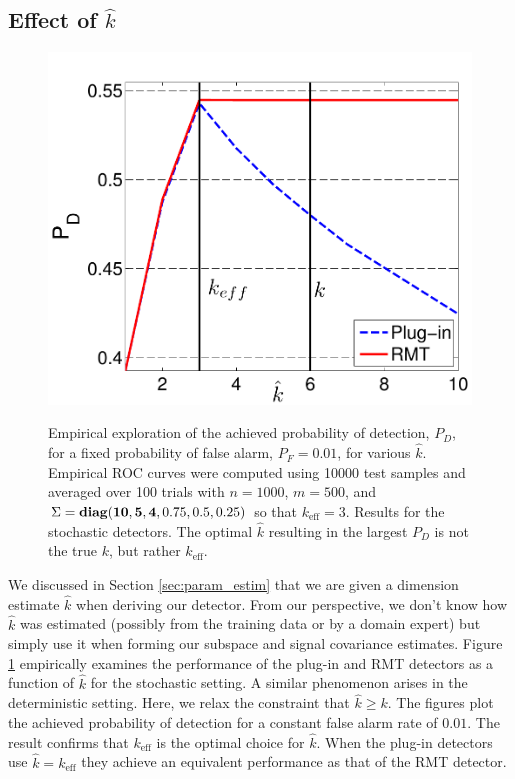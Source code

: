 \subsection{Effect of $\widehat{k}$}
\begin{figure}
\centering
\includegraphics[width=\figwidth]{figures/asend7.pdf}
\label{fig:stoch_khat}
\vspace{-0.1in}
\caption{Empirical exploration of the achieved probability of detection, $P_D$, for a
  fixed probability of false alarm, $P_F=0.01$, for various $\widehat{k}$. Empirical ROC
  curves were computed using 10000 test samples and averaged over 100 trials with
  $n=1000$, $m=500$, and $\Sigma = \mathop{\bf diag}({\bf{10,5,4}},0.75,0.5,0.25)$ so that
  $k_{\text{eff}}=3$. Results for the stochastic detectors. The optimal $\widehat{k}$ resulting in the largest $P_D$ is not the true $k$, but rather $k_\text{eff}$.} %
\label{fig:khat_graphs}
\vspace{-0.3in}
\end{figure}

We discussed in Section \ref{sec:param_estim} that we are given a dimension estimate
$\widehat{k}$ when deriving our detector. From our perspective, we don't know how
$\widehat{k}$ was estimated (possibly from the training data or by a domain expert) but
simply use it when forming our subspace and signal covariance estimates. Figure
\ref{fig:khat_graphs} empirically examines the performance of the plug-in and RMT detectors
as a function of $\widehat{k}$ for the stochastic setting. A similar phenomenon arises in
the deterministic setting. Here, we relax the constraint that $\widehat{k}\geq k$. The figures plot the achieved probability of detection for a constant false alarm rate of $0.01$. The result confirms that $k_\text{eff}$ is the optimal choice for $\widehat{k}$. When the plug-in detectors use $\widehat{k} = k_\text{eff}$ they achieve an equivalent performance as that of the RMT detector.

